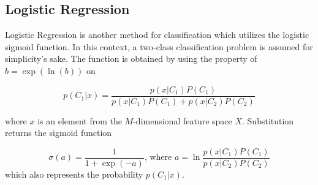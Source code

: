 \subsection{Logistic Regression}
Logistic Regression is another method for classification which utilizes the logistic sigmoid function. In this context, a two-class classification problem is assumed for simplicity's sake. The function is obtained by using the property of $b = \exp(\ln(b))$ on 

\begin{equation}
	p(C_1|x)  = \frac{p(x|C_1)P(C_1)}{p(x|C_1)P(C_1)+p(x|C_2)P(C_2)}
\end{equation}

where $x$ is an element from the $M$-dimensional feature space $X$. Substitution returns the sigmoid function 

\begin{equation} \label{eq:sigmoid}
\sigma(a) = \frac{1}{1 + \exp(-a)} \text{, where } a = \ln\frac{p(x|C_1)P(C_1)}{p(x|C_2)P(C_2)}
\end{equation}
which also represents the probability $p(C_1|x)$. 

